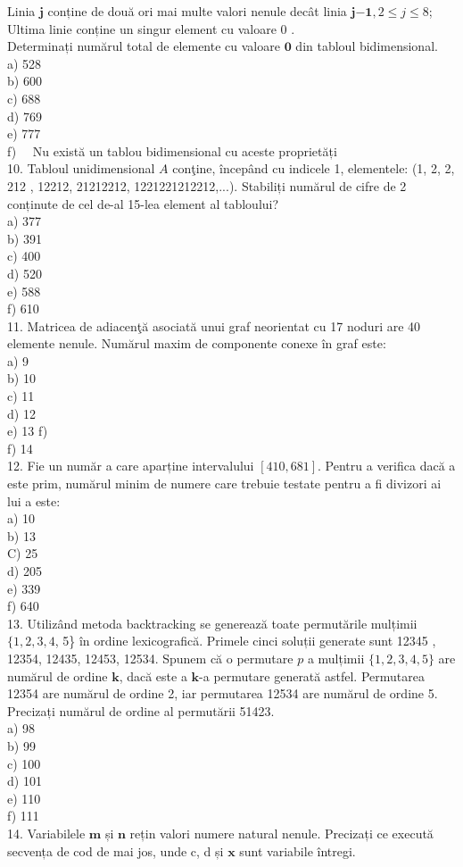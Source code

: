 Linia $\mathbf{j}$ conține de două ori mai multe valori nenule decât linia $\mathbf{j} \mathbf{- 1}, 2 \leq j \leq 8$; Ultima linie conține un singur element cu valoare 0 .\\
Determinați numărul total de elemente cu valoare $\mathbf{0}$ din tabloul bidimensional.\\
a) 528\\
b) 600\\
c) 688\\
d) 769\\
e) 777\\
f) $\quad \mathrm{Nu}$ există un tablou bidimensional cu aceste proprietăți\\
10. Tabloul unidimensional $A$ conţine, începând cu indicele 1, elementele: (1, 2, 2, 212 , 12212, 21212212, 1221221212212,...). Stabiliți numărul de cifre de 2 conținute de cel de-al 15-lea element al tabloului?\\
a) 377\\
b) 391\\
c) 400\\
d) 520\\
e) 588\\
f) 610\\
11. Matricea de adiacenţă asociată unui graf neorientat cu 17 noduri are 40 elemente nenule. Numărul maxim de componente conexe în graf este:\\
a) 9\\
b) 10\\
c) 11\\
d) 12\\
e) 13 f)\\
f) 14\\
12. Fie un număr a care aparține intervalului $[410,681]$. Pentru a verifica dacă a este prim, numărul minim de numere care trebuie testate pentru a fi divizori ai lui a este:\\
a) 10\\
b) 13\\
C) 25\\
d) 205\\
e) 339\\
f) 640\\
13. Utilizând metoda backtracking se generează toate permutările mulțimii $\{1,2,3,4$, 5\} în ordine lexicografică. Primele cinci soluții generate sunt 12345 , 12354, 12435, 12453, 12534. Spunem că o permutare $p$ a mulțimii $\{1,2,3,4,5\}$ are numărul de ordine $\mathbf{k}$, dacă este a $\mathbf{k}$-a permutare generată astfel. Permutarea 12354 are numărul de ordine 2, iar permutarea 12534 are numărul de ordine 5. Precizați numărul de ordine al permutării 51423.\\
a) 98\\
b) 99\\
c) 100\\
d) 101\\
e) 110\\
f) 111\\
14. Variabilele $\mathbf{m}$ și $\mathbf{n}$ rețin valori numere natural nenule. Precizați ce execută secvența de cod de mai jos, unde c, d și $\mathbf{x}$ sunt variabile întregi.

